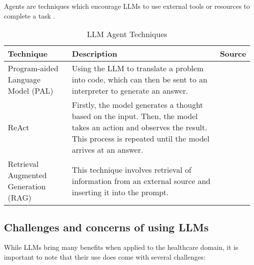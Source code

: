 Agents are techniques which encourage LLMs to use external tools or resources to complete a task \parencite{prompt1}.

\begin{table}[h!]
    \centering
    \begin{tabular}{p{3cm} p{8cm} p{2cm}}
        \toprule
        \textbf{Technique} & \textbf{Description} & \textbf{Source} \\
        \midrule
        \raggedright
        Program-aided Language Model (PAL) & Using the LLM to translate a problem into code, which can then be sent to an interpreter to generate an answer. & \textcite{pal} \\
        \hline
        \raggedright
        ReAct & Firstly, the model generates a thought based on the input. Then, the model takes an action and observes the result. This process is repeated until the model arrives at an answer. & \textcite{react-llm} \\
        \hline
        \raggedright
        Retrieval Augmented Generation (RAG) & This technique involves retrieval of information from an external source and inserting it into the prompt. & \textcite{rag} \\
        \bottomrule
    \end{tabular}
    \caption{LLM Agent Techniques}
    \label{tab:agents}
\end{table}

\FloatBarrier

\subsection{Challenges and concerns of using LLMs}

While LLMs bring many benefits when applied to the healthcare domain, it is important to note that their use does come with several challenges:

